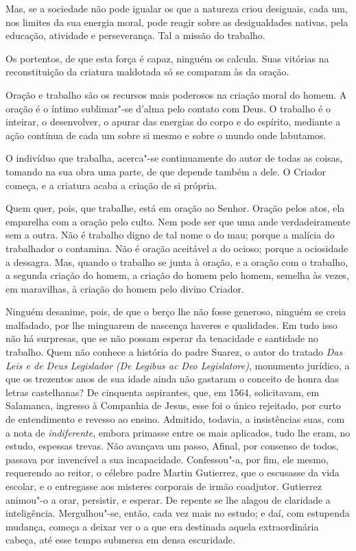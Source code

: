Mas, se a sociedade não pode igualar os que a natureza criou
desiguais, cada um, nos limites da sua energia moral, pode reagir sobre
as desigualdades nativas, pela educação, atividade e perseverança. Tal
a missão do trabalho.

Os portentos, de que esta força é capaz, ninguém os calcula. Suas
vitórias na reconstituição da criatura maldotada só se comparam às da oração.

Oração e trabalho são os recursos mais poderosos na criação moral
do homem. A oração é o íntimo sublimar"-se d'alma pelo
contato com Deus. O trabalho é o inteirar, o desenvolver, o apurar das
energias do corpo e do espírito, mediante a ação contínua de cada um
sobre si mesmo e sobre o mundo onde labutamos.

O indivíduo que trabalha, acerca"-se continuamente do autor de
todas as coisas, tomando na sua obra uma parte, de que depende também a
dele. O Criador começa, e a criatura acaba a criação de si própria.

Quem quer, pois, que trabalhe, está em oração ao Senhor. Oração
pelos atos, ela emparelha com a oração pelo culto. Nem pode ser que uma
ande verdadeiramente sem a outra. Não é trabalho digno de tal nome o do
mau; porque a malícia do trabalhador o contamina. Não é oração
aceitável a do ocioso; porque a ociosidade a dessagra. Mas, quando o
trabalho se junta à oração, e a oração com o trabalho, a segunda
criação do homem, a criação do homem pelo homem, semelha às vezes, em
maravilhas, à criação do homem pelo divino Criador.

Ninguém desanime, pois, de que o berço lhe não fosse generoso,
ninguém se creia malfadado, por lhe minguarem de nascença haveres e
qualidades. Em tudo isso não há surpresas, que se não possam esperar da
tenacidade e santidade no trabalho. Quem não conhece a história do
padre Suarez, o autor do tratado \textit{Das Leis e de Deus Legislador}
\textit{(De Legibus ac Deo Legislatore)}, monumento jurídico, a que os
trezentos anos de sua idade ainda não gastaram o conceito de honra das
letras castelhanas? De cinquenta aspirantes, que, em 1564, solicitavam,
em Salamanca, ingresso à Companhia de Jesus, esse foi o único rejeitado, por curto de
entendimento e revesso ao ensino. Admitido, todavia, a insistências
suas, com a nota de \textit{indiferente}, embora primasse entre os mais
aplicados, tudo lhe eram, no estudo, espessas trevas. Não avançava um
passo, Afinal, por consenso de todos, passava por invencível a sua
incapacidade. Confessou"-a, por fim, ele mesmo, requerendo ao reitor, o
célebre padre Martin Gutierrez, que o escusasse da vida escolar, e o
entregasse aos misteres corporais de irmão coadjutor. Gutierrez
animou"-o a orar, persistir, e esperar. De repente se lhe alagou de
claridade a inteligência. Mergulhou"-se, então, cada vez mais no estudo;
e daí, com estupenda mudança, começa a deixar ver o a que era destinada
aquela extraordinária cabeça, até esse tempo submersa em densa escuridade.

